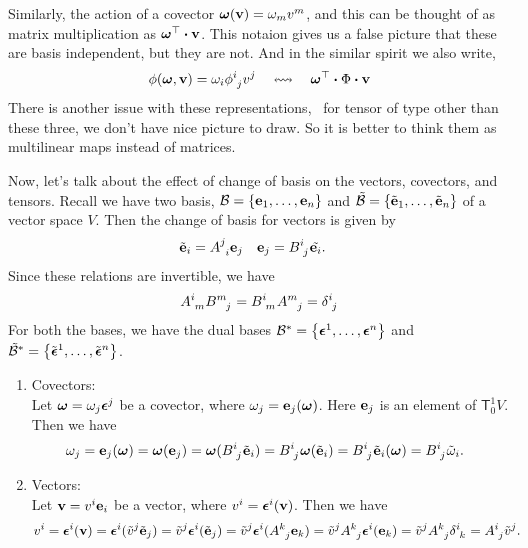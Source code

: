Similarly, the action of a covector \(\vb*{\omega}(\vb{v}) = \omega_m v^m\), and this can be thought of as matrix multiplication as \(\vb*{\omega}\trans \vdot \vb{v}\). This notaion gives us a false picture that these are basis independent, but they are not. And in the similar spirit we also write,
\begin{equation}
    \phi(\vb*{\omega}, \vb{v}) = \omega_i \tensor{\phi}{^{i}_{j}} v^j \quad \leftrightsquigarrow \quad \vb*{\omega}\trans \vdot \Phi \vdot \vb{v}
\end{equation}
There is another issue with these representations, \ie\ for tensor of type other than these three, we don't have nice picture to draw. So it is better to think them as multilinear maps instead of matrices.

Now, let's talk about the effect of change of basis on the vectors, covectors, and tensors. Recall we have two basis, \(\mathcal B = \qty{\vb{e}_1, \ldots, \vb{e}_n}\) and \(\tilde{\mathcal B} = \qty{\tilde{\vb{e}}_1, \ldots, \tilde{\vb{e}}_n}\) of a vector space \(V\). Then the change of basis for vectors is given by
\begin{align}
    \tilde{\vb{e}}_i & = \tensor{A}{^j_i} \vb{e}_j &  & \vb{e}_j = \tensor{B}{^i_j} \tilde{\vb{e}_i}.
\end{align}
Since these relations are invertible, we have
\begin{equation}
    \tensor{A}{^i_m} \tensor{B}{^m_j} = \tensor{B}{^i_m} \tensor{A}{^m_j} = \tensor{\delta}{^i_j}
\end{equation}
For both the bases, we have the dual bases \(\mathcal B^* = \qty{\vb*{\epsilon}^1, \ldots, \vb*{\epsilon}^n}\) and \(\tilde{\mathcal B}^* = \qty{\tilde{\vb*{\epsilon}}^1, \ldots, \tilde{\vb*{\epsilon}}^n}\).
\begin{enumerate}
    \item \textsf{Covectors:}\\
          Let \(\vb*{\omega} = \omega_j \vb*{\epsilon}^j\) be a covector, where \(\omega_j = \vb{e}_j(\vb*{\omega})\). Here \(\vb{e}_j\) is an element of \(\mathsf{T}^1_0 V\). Then we have
          \begin{align}
              \omega_j & = \vb{e}_j(\vb*{\omega}) = \vb*{\omega}(\vb{e}_j) = \vb*{\omega}(\tensor{B}{^i_j} \tilde{\vb{e}}_i) = \tensor{B}{^i_j} \vb*{\omega}(\tilde{\vb{e}}_i) = \tensor{B}{^i_j} \tilde{\vb{e}}_i(\vb*{\omega}) = \tensor{B}{^i_j} \tilde{\omega}_i.
          \end{align}

    \item \textsf{Vectors:}\\
          Let \(\vb{v} = v^i \vb{e}_i\) be a vector, where \(v^i = \vb*{\epsilon}^i(\vb{v})\). Then we have
          \begin{align}
              v^i & = \vb*{\epsilon}^i(\vb{v}) = \vb*{\epsilon}^i(\tilde{v}^j \tilde{\vb{e}}_j) = \tilde{v}^j \vb*{\epsilon}^i(\tilde{\vb{e}}_j) = \tilde{v}^j \vb*{\epsilon}^i(\tensor{A}{^k_j} \vb{e}_k) = \tilde{v}^j \tensor{A}{^k_j} \vb*{\epsilon}^i(\vb{e}_k) = \tilde{v}^j \tensor{A}{^k_j} \tensor{\delta}{^i_k} = \tensor{A}{^i_j} \tilde{v}^j.
          \end{align}
\end{enumerate}
